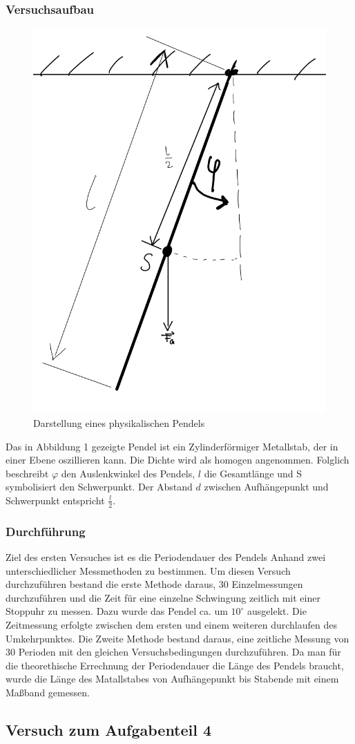 \documentclass[11pt,a4paper]{article}
\begin{document}
      \subsubsection{Versuchsaufbau}
      \begin{figure}[h]
      	\includegraphics[width=0.4\linewidth]{physikalisches Pendel.png}
      	\centering
      	\caption{Darstellung eines physikalischen Pendels \text{[1]}}
      \end{figure}
Das in Abbildung 1 gezeigte Pendel  ist ein Zylinderförmiger Metallstab, der in einer Ebene oszillieren kann. Die Dichte wird als homogen angenommen. Folglich beschreibt $\varphi$  den Auslenkwinkel des Pendels, $l$ die Gesamtlänge und S symbolisiert den Schwerpunkt. Der Abstand $d$ zwischen Aufhängepunkt und Schwerpunkt entspricht $\frac{l}{2}$.
      \subsubsection{Durchführung}

Ziel des ersten Versuches ist es die Periodendauer des Pendels Anhand zwei unterschiedlicher Messmethoden zu bestimmen. Um diesen Versuch durchzuführen bestand die erste Methode daraus, 30 Einzelmessungen durchzuführen und die Zeit für eine einzelne Schwingung zeitlich mit einer Stoppuhr zu messen. Dazu wurde das Pendel ca. um $10^\circ$ ausgelekt.
 Die Zeitmessung erfolgte zwischen dem ersten und einem weiteren durchlaufen des Umkehrpunktes.
 Die Zweite Methode bestand daraus, eine zeitliche Messung von 30 Perioden mit den gleichen Versuchsbedingungen durchzuführen.
 Da man für die theorethische Errechnung der Periodendauer die Länge des Pendels braucht, wurde die Länge des Matallstabes von Aufhängepunkt bis Stabende mit einem Maßband gemessen.

\subsection{Versuch zum Aufgabenteil 4}
\end{document}
